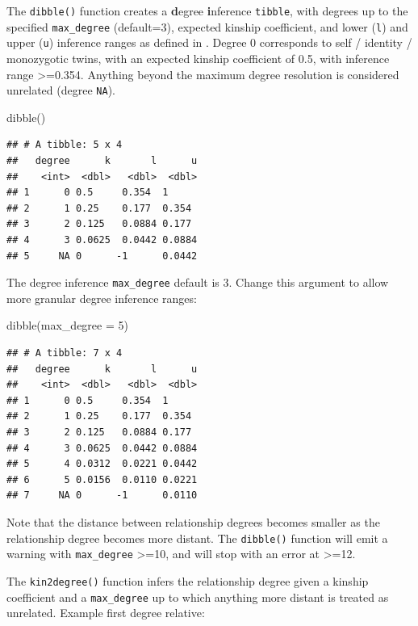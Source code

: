 \documentclass[9pt,a4paper,]{extarticle}
\newenvironment{Shaded}{\begin{snugshade}}{\end{snugshade}}
\newcommand{\AttributeTok}[1]{\textcolor[rgb]{0.77,0.63,0.00}{#1}}
\newcommand{\DecValTok}[1]{\textcolor[rgb]{0.00,0.00,0.81}{#1}}
\newcommand{\FunctionTok}[1]{\textcolor[rgb]{0.00,0.00,0.00}{#1}}
\newcommand{\NormalTok}[1]{#1}
\begin{document}
The \texttt{dibble()} function creates a \textbf{d}egree \textbf{i}nference \texttt{tibble}, with degrees up to the specified \texttt{max\_degree} (default=3), expected kinship coefficient, and lower (\texttt{l}) and upper (\texttt{u}) inference ranges as defined in \citet{manichaikul2010}. Degree 0 corresponds to self / identity / monozygotic twins, with an expected kinship coefficient of 0.5, with inference range \textgreater=0.354. Anything beyond the maximum degree resolution is considered unrelated (degree \texttt{NA}).

\begin{Shaded}
\begin{Highlighting}[]
\FunctionTok{dibble}\NormalTok{()}
\end{Highlighting}
\end{Shaded}

\begin{verbatim}
## # A tibble: 5 x 4
##   degree      k       l      u
##    <int>  <dbl>   <dbl>  <dbl>
## 1      0 0.5     0.354  1     
## 2      1 0.25    0.177  0.354 
## 3      2 0.125   0.0884 0.177 
## 4      3 0.0625  0.0442 0.0884
## 5     NA 0      -1      0.0442
\end{verbatim}

The degree inference \texttt{max\_degree} default is 3. Change this argument to allow more granular degree inference ranges:

\begin{Shaded}
\begin{Highlighting}[]
\FunctionTok{dibble}\NormalTok{(}\AttributeTok{max\_degree =} \DecValTok{5}\NormalTok{)}
\end{Highlighting}
\end{Shaded}

\begin{verbatim}
## # A tibble: 7 x 4
##   degree      k       l      u
##    <int>  <dbl>   <dbl>  <dbl>
## 1      0 0.5     0.354  1     
## 2      1 0.25    0.177  0.354 
## 3      2 0.125   0.0884 0.177 
## 4      3 0.0625  0.0442 0.0884
## 5      4 0.0312  0.0221 0.0442
## 6      5 0.0156  0.0110 0.0221
## 7     NA 0      -1      0.0110
\end{verbatim}

Note that the distance between relationship degrees becomes smaller as the relationship degree becomes more distant. The \texttt{dibble()} function will emit a warning with \texttt{max\_degree} \textgreater=10, and will stop with an error at \textgreater=12.

The \texttt{kin2degree()} function infers the relationship degree given a kinship coefficient and a \texttt{max\_degree} up to which anything more distant is treated as unrelated. Example first degree relative:
\end{document}
